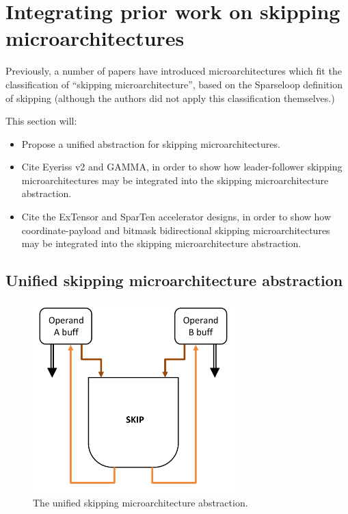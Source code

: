 \section{Integrating prior work on skipping microarchitectures}

Previously, a number of papers have introduced microarchitectures which fit the classification of ``skipping microarchitecture'', based on the Sparseloop\cite{sparseloop} definition of skipping (although the authors did not apply this classification themselves.)

This section will:

\begin{itemize}
    \item Propose a unified abstraction for skipping microarchitectures.
    \item Cite Eyeriss v2\cite{eyerissv2} and GAMMA\cite{gamma}, in order to show how leader-follower\cite{sparseloop} skipping microarchitectures may be integrated into the skipping microarchitecture abstraction.
    \item Cite the ExTensor\cite{extensor} and SparTen\cite{sparten} accelerator designs, in order to show how coordinate-payload and bitmask bidirectional skipping microarchitectures may be integrated into the skipping microarchitecture abstraction.
\end{itemize}

\subsection{Unified skipping microarchitecture abstraction}
\label{sec:unified_skipping_abstraction}

\begin{figure}[ht]
    \centering
    \includegraphics[width=0.7\textwidth]{figures/uniform_skip_topo.pdf}
    \caption{The unified skipping microarchitecture abstraction.}
    \label{fig:uniform_skip_topo}
\end{figure}

